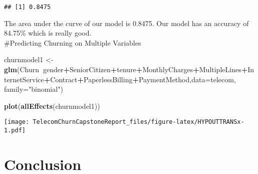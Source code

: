 \documentclass[]{article}
\newenvironment{Shaded}{\begin{snugshade}}{\end{snugshade}}
\newcommand{\KeywordTok}[1]{\textcolor[rgb]{0.13,0.29,0.53}{\textbf{#1}}}
\newcommand{\DataTypeTok}[1]{\textcolor[rgb]{0.13,0.29,0.53}{#1}}
\newcommand{\StringTok}[1]{\textcolor[rgb]{0.31,0.60,0.02}{#1}}
\newcommand{\OperatorTok}[1]{\textcolor[rgb]{0.81,0.36,0.00}{\textbf{#1}}}
\newcommand{\NormalTok}[1]{#1}
\begin{document}
\begin{verbatim}
## [1] 0.8475
\end{verbatim}

The area under the curve of our model is 0.8475. Our model has an
accuracy of 84.75\% which is really good.\\
\#Predicting Churning on Multiple Variables

\begin{Shaded}
\begin{Highlighting}[]
\NormalTok{churnmodel1 <-}\StringTok{ }\KeywordTok{glm}\NormalTok{(Churn}\OperatorTok{~}\NormalTok{gender}\OperatorTok{+}\NormalTok{SeniorCitizen}\OperatorTok{+}\NormalTok{tenure}\OperatorTok{+}\NormalTok{MonthlyCharges}\OperatorTok{+}\NormalTok{MultipleLines}\OperatorTok{+}\NormalTok{InternetService}\OperatorTok{+}\NormalTok{Contract}\OperatorTok{+}\NormalTok{PaperlessBilling}\OperatorTok{+}\NormalTok{PaymentMethod,}\DataTypeTok{data=}\NormalTok{telecom, }\DataTypeTok{family=}\StringTok{"binomial"}\NormalTok{)}





\KeywordTok{plot}\NormalTok{(}\KeywordTok{allEffects}\NormalTok{(churnmodel1))}
\end{Highlighting}
\end{Shaded}

\texttt{[image: TelecomChurnCapstoneReport\_files/figure-latex/HYPOUTTRANSx-1.pdf]}

\section{Conclusion}\label{conclusion}
\end{document}
